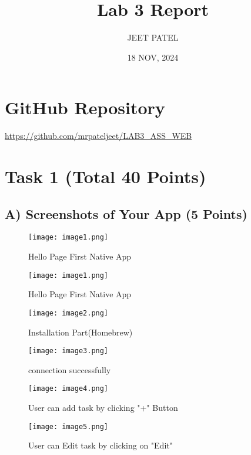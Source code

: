 \documentclass{article}
\title{Lab 3 Report}
\author{JEET PATEL}
\date{18 NOV, 2024}
\begin{document}
\maketitle
\section*{GitHub Repository}
\url{https://github.com/mrpateljeet/LAB3_ASS_WEB}
\section*{Task 1 (Total 40 Points)}

\subsection*{A) Screenshots of Your App (5 Points)}
\begin{figure}
    \centering
    \texttt{[image: image1.png]} 
    \caption{Hello Page First Native App}
    \label{fig:screenshot1}
\end{figure}

\begin{figure}
    \centering
    \texttt{[image: image1.png]} 
    \caption{Hello Page First Native App}
    \label{fig:screenshot1}
\end{figure}

\begin{figure}
    \centering
    \texttt{[image: image2.png]} 
    \caption{Installation Part(Homebrew)}
    \label{fig:screenshot2}
\end{figure}

\begin{figure}
    \centering
    \texttt{[image: image3.png]} 
    \caption{connection successfully }
    \label{fig:screenshot3}
\end{figure}

\begin{figure}
    \centering
    \texttt{[image: image4.png]} 
    \caption{User can add task by clicking "+" Button}
    \label{fig:screenshot4}
\end{figure}

\begin{figure}
    \centering
    \texttt{[image: image5.png]} 
    \caption{User can Edit task by clicking on "Edit"}
    \label{fig:screenshot5}
\end{figure}
\end{document}
